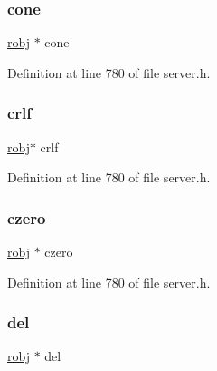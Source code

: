 \subsubsection{\texorpdfstring{cone}{cone}}
{\footnotesize\ttfamily \hyperlink{server_8h_a540f174d2685422fbd7d12e3cd44c8e2}{robj} $\ast$ cone}



Definition at line 780 of file server.\+h.

\mbox{\label{structshared_objects_struct_a8e86d7d4a75a99a34dbd2a92d4b72f7b}} 
\subsubsection{\texorpdfstring{crlf}{crlf}}
{\footnotesize\ttfamily \hyperlink{server_8h_a540f174d2685422fbd7d12e3cd44c8e2}{robj}$\ast$ crlf}



Definition at line 780 of file server.\+h.

\mbox{\label{structshared_objects_struct_a6f3eb32f4b1c6b80d7c749a1436161cd}} 
\subsubsection{\texorpdfstring{czero}{czero}}
{\footnotesize\ttfamily \hyperlink{server_8h_a540f174d2685422fbd7d12e3cd44c8e2}{robj} $\ast$ czero}



Definition at line 780 of file server.\+h.

\mbox{\label{structshared_objects_struct_a8e6a0ce0f0a88aca63b18e417de09cac}} 
\subsubsection{\texorpdfstring{del}{del}}
{\footnotesize\ttfamily \hyperlink{server_8h_a540f174d2685422fbd7d12e3cd44c8e2}{robj} $\ast$ del}



